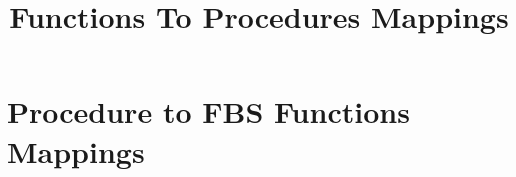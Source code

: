 \documentclass[10pt,a4paper]{article}
\title{Functions To Procedures Mappings}
\begin{document}
	\maketitle
	\tableofcontents
	
	\newpage
	\section{Procedure to FBS Functions Mappings}
	\label{sec:ea}
			
\end{document}
